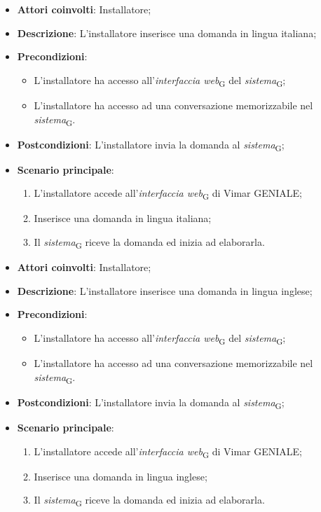 \begin{itemize}
    \item \textbf{Attori coinvolti}: Installatore;
    \item \textbf{Descrizione}: L’installatore inserisce una domanda in lingua italiana;
    \item \textbf{Precondizioni}: 
    \begin{itemize}
        \item L’installatore ha accesso all’\textit{interfaccia web}\textsubscript{G} del \textit{sistema}\textsubscript{G};
        \item L’installatore ha accesso ad una conversazione memorizzabile nel \textit{sistema}\textsubscript{G}.
    \end{itemize}
    \item \textbf{Postcondizioni}: L'installatore invia la domanda al \textit{sistema}\textsubscript{G};
    \item \textbf{Scenario principale}:
    \begin{enumerate}
        \item L’installatore accede all’\textit{interfaccia web}\textsubscript{G} di Vimar GENIALE;
        \item Inserisce una domanda in lingua italiana;
        \item Il \textit{sistema}\textsubscript{G} riceve la domanda ed inizia ad elaborarla.
    \end{enumerate}
\end{itemize}

\begin{itemize}
    \item \textbf{Attori coinvolti}: Installatore;
    \item \textbf{Descrizione}: L’installatore inserisce una domanda in lingua inglese;
    \item \textbf{Precondizioni}: 
    \begin{itemize}
        \item L’installatore ha accesso all’\textit{interfaccia web}\textsubscript{G} del \textit{sistema}\textsubscript{G};
        \item L’installatore ha accesso ad una conversazione memorizzabile nel \textit{sistema}\textsubscript{G}.
    \end{itemize}
    \item \textbf{Postcondizioni}: L'installatore invia la domanda al \textit{sistema}\textsubscript{G};
    \item \textbf{Scenario principale}:
    \begin{enumerate}
        \item L’installatore accede all’\textit{interfaccia web}\textsubscript{G} di Vimar GENIALE;
        \item Inserisce una domanda in lingua inglese;
        \item Il \textit{sistema}\textsubscript{G} riceve la domanda ed inizia ad elaborarla.
    \end{enumerate}
\end{itemize}

